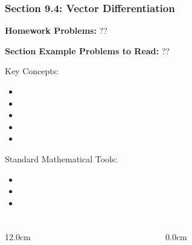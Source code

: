 %
% 

\begin{frame}
\frametitle{\Large {\color[rgb]{0.02,0.20,1.0} Section 9.4: Vector Differentiation}}
\scriptsize

\vspace{0.2cm}
{\bf Homework Problems:} \quad ??

\vspace{0.2cm}

{\bf Section Example Problems to Read:} \quad ??

\vspace{0.2cm}

\begin{block}{Key Concepts:}
\begin{itemize}
	\item[...] 
	\item[...] 
	\item[...] 
	\item[...] 
	\item[...] 
\end{itemize}
\end{block}

\begin{block}{Standard Mathematical Tools:}
\begin{itemize}
	\item[...] 
	\item[...] 
	\item[...] 
\end{itemize}
\end{block}

\end{frame}

\begin{frame}
\frametitle{}
\scriptsize
\begin{columns}
\begin{column}{12.0cm}
	
\end{column}
\begin{column}{0.0cm}\end{column}
\end{columns}
\end{frame}

